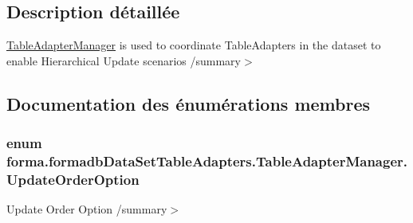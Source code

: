 \subsection{Description détaillée}
\hyperlink{classforma_1_1formadb_data_set_table_adapters_1_1_table_adapter_manager}{Table\+Adapter\+Manager} is used to coordinate Table\+Adapters in the dataset to enable Hierarchical Update scenarios /summary$>$ 

\subsection{Documentation des énumérations membres}
\subsubsection[{\texorpdfstring{Update\+Order\+Option}{UpdateOrderOption}}]{\setlength{\rightskip}{0pt plus 5cm}enum {\bf forma.\+formadb\+Data\+Set\+Table\+Adapters.\+Table\+Adapter\+Manager.\+Update\+Order\+Option}\hspace{0.3cm}{\ttfamily [strong]}}\hypertarget{classforma_1_1formadb_data_set_table_adapters_1_1_table_adapter_manager_aca02cb135cfe46391a8a8e751cfed92b}{}\label{classforma_1_1formadb_data_set_table_adapters_1_1_table_adapter_manager_aca02cb135cfe46391a8a8e751cfed92b}


Update Order Option /summary$>$ 

